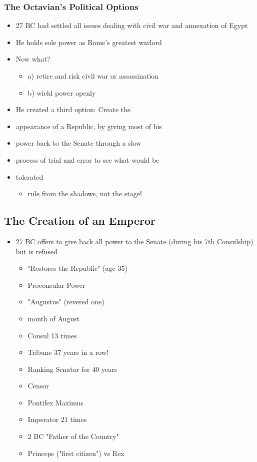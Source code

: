 \documentclass[12pt, twoside]{article}
\begin{document}
\subsubsection{The Octavian’s Political Options}
\begin{itemize}
\item 27 BC had settled all issues dealing with civil war and annexation of Egypt
\item He holds sole power as Rome’s greatest warlord
\item Now what?
	\begin{itemize}
	\item a) retire and risk civil war or assassination
	\item b) wield power openly
	\end{itemize}
\item He created a third option: Create the
\item appearance of a Republic, by giving most of his
\item power back to the Senate through a slow
\item process of trial and error to see what would be
\item tolerated
	\begin{itemize}
	\item rule from the shadows, not the stage!
	\end{itemize}
\end{itemize}

\subsection{The Creation of an Emperor}
\begin{itemize}
\item 27 BC offers to give back all power to the Senate (during his 7th Consulship) but is refused
	\begin{itemize}
	\item "Restores the Republic" (age 35)
	\item Proconsular Power
	\item "Augustus" (revered one)
	\item month of August
	\item Consul 13 times
	\item Tribune 37 years in a row!
	\item Ranking Senator for 40 years
	\item Censor
	\item Pontifex Maximus
	\item Imperator 21 times
	\item 2 BC "Father of the Country"
	\item Princeps ("first citizen") vs Rex
	\end{itemize}
\end{itemize}
\end{document}
